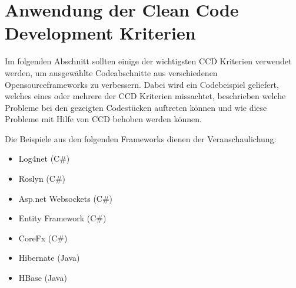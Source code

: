 \chapter{Anwendung der Clean Code Development Kriterien}
Im folgenden Abschnitt sollten einige der wichtigsten CCD Kriterien verwendet werden, um ausgewählte Codeabschnitte aus verschiedenen Opensourceframeworks zu verbessern. Dabei wird ein Codebeispiel geliefert, welches eines oder mehrere der CCD Kriterien missachtet, beschrieben welche Probleme bei den gezeigten Codestücken auftreten können und wie diese Probleme mit Hilfe von CCD behoben werden können.

\SuperPar Die Beispiele aus den folgenden Frameworks dienen der Veranschaulichung:

\begin{itemize}
	\item Log4net (C\#)
	\item Roslyn (C\#)
	\item Asp.net Websockets (C\#)
	\item Entity Framework (C\#)
	\item CoreFx (C\#)
	\item Hibernate (Java)
	\item HBase (Java)
\end{itemize}